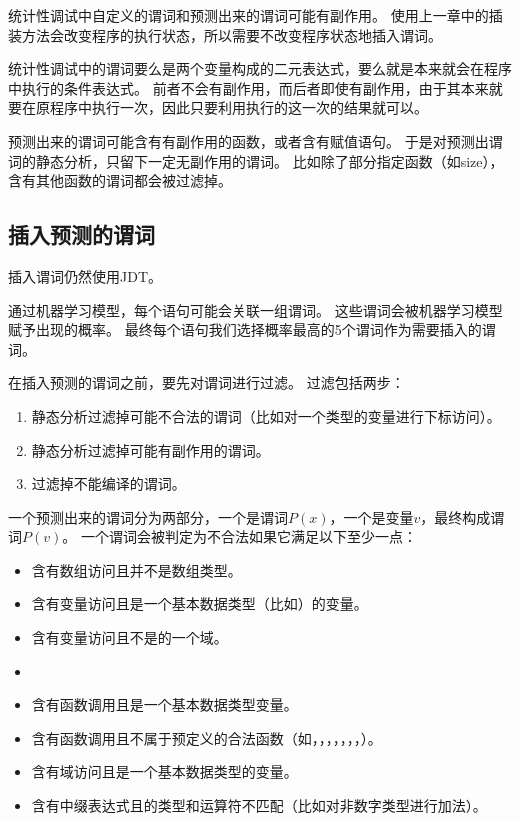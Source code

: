 统计性调试中自定义的谓词和预测出来的谓词可能有副作用。
使用上一章中的插装方法会改变程序的执行状态，所以需要不改变程序状态地插入谓词。

统计性调试中的谓词要么是两个变量构成的二元表达式，要么就是本来就会在程序中执行的条件表达式。
前者不会有副作用，而后者即使有副作用，由于其本来就要在原程序中执行一次，因此只要利用执行的这一次的结果就可以。

预测出来的谓词可能含有有副作用的函数，或者含有赋值语句。
于是对预测出谓词的静态分析，只留下一定无副作用的谓词。
比如除了部分指定函数（如size），含有其他函数的谓词都会被过滤掉。

\subsection{插入预测的谓词}

插入谓词仍然使用JDT。

通过机器学习模型，每个语句可能会关联一组谓词。
这些谓词会被机器学习模型赋予出现的概率。
最终每个语句我们选择概率最高的5个谓词作为需要插入的谓词。

在插入预测的谓词之前，要先对谓词进行过滤。
过滤包括两步：
\begin{enumerate}
\item 静态分析过滤掉可能不合法的谓词（比如对一个类型的变量进行下标访问）。
\item 静态分析过滤掉可能有副作用的谓词。
\item 过滤掉不能编译的谓词。
\end{enumerate}

一个预测出来的谓词分为两部分，一个是谓词$P(x)$，一个是变量$v$，最终构成谓词$P(v)$。
一个谓词会被判定为不合法如果它满足以下至少一点：
\begin{itemize}
\item 含有数组访问且并不是数组类型。
\item 含有变量访问且是一个基本数据类型（比如）的变量。
\item 含有变量访问且不是的一个域。
\item {}
\item 含有函数调用且是一个基本数据类型变量。
\item 含有函数调用且不属于预定义的合法函数（如，，，，，，，）。
\item 含有域访问且是一个基本数据类型的变量。
\item 含有中缀表达式且的类型和运算符不匹配（比如对非数字类型进行加法）。
\end{itemize}

